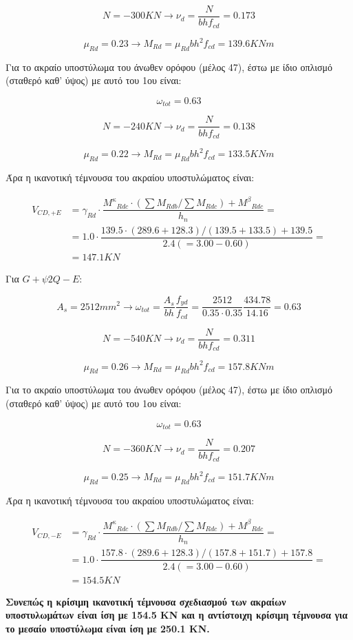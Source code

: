\[
N = -300 KN \rightarrow \nu_d = \dfrac{N}{bhf_{cd}} = 0.173
\]

\[
\mu_{Rd} = 0.23 \rightarrow M_{Rd} = \mu_{Rd}bh^2 f_{cd} = 139.6KNm
\]

\noindent
Για το ακραίο υποστύλωμα του άνωθεν ορόφου (μέλος 47), έστω με ίδιο οπλισμό (σταθερό καθ' ύψος) με αυτό του 1ου είναι:

\[
\omega_{tot} = 0.63
\]

\[
N = -240 KN \rightarrow \nu_d = \dfrac{N}{bhf_{cd}} = 0.138
\]

\[
\mu_{Rd} = 0.22 \rightarrow M_{Rd} = \mu_{Rd}bh^2 f_{cd} = 133.5KNm
\]

\noindent
Άρα η ικανοτική τέμνουσα του ακραίου υποστυλώματος είναι:

\begin{align*}
V_{CD,+Ε} &= \gamma_{Rd}\cdot\dfrac{{M^{\kappa}}_{Rdc}\cdot\left(\sum M_{Rdb}/\sum M_{Rdc}\right)+{M^{\beta}}_{Rdc}}{h_n} = \\[15pt]
&= 1.0\cdot\dfrac{139.5\cdot(289.6+128.3)/(139.5+133.5) + 139.5}{2.4(=3.00 - 0.60)} = \\[15pt]
&= 147.1KN
\end{align*}

\noindent
Για $G+\psi2Q-E$:

\[
A_s = 2512 mm^2 \rightarrow \omega_{tot} = \dfrac{A_s}{bh}\dfrac{f_{yd}}{f_{cd}} = \dfrac{2512}{0.35\cdot0.35}\dfrac{434.78}{14.16} = 0.63
\]

\[
N = -540 KN \rightarrow \nu_d = \dfrac{N}{bhf_{cd}} = 0.311
\]

\[
\mu_{Rd} = 0.26 \rightarrow M_{Rd} = \mu_{Rd}bh^2 f_{cd} = 157.8KNm
\]

\noindent
Για το ακραίο υποστύλωμα του άνωθεν ορόφου (μέλος 47), έστω με ίδιο οπλισμό (σταθερό καθ' ύψος) με αυτό του 1ου είναι:

\[
\omega_{tot} = 0.63
\]

\[
N = -360 KN \rightarrow \nu_d = \dfrac{N}{bhf_{cd}} = 0.207
\]

\[
\mu_{Rd} = 0.25 \rightarrow M_{Rd} = \mu_{Rd}bh^2 f_{cd} = 151.7KNm
\]

\noindent
Άρα η ικανοτική τέμνουσα του ακραίου υποστυλώματος είναι:

\begin{align*}
V_{CD,-Ε} &= \gamma_{Rd}\cdot\dfrac{{M^{\kappa}}_{Rdc}\cdot\left(\sum M_{Rdb}/\sum M_{Rdc}\right)+{M^{\beta}}_{Rdc}}{h_n} = \\[15pt]
&= 1.0\cdot\dfrac{157.8\cdot(289.6+128.3)/(157.8+151.7) + 157.8}{2.4(=3.00 - 0.60)} = \\[15pt]
&= 154.5KN
\end{align*}

\bigskip

\noindent\textbf{\textcolor{mygreen}{Συνεπώς η κρίσιμη ικανοτική τέμνουσα σχεδιασμού των ακραίων υποστυλωμάτων είναι ίση με 154.5 KN και η αντίστοιχη κρίσιμη τέμνουσα για το μεσαίο υποστύλωμα είναι ίση με 250.1 ΚΝ.}}
